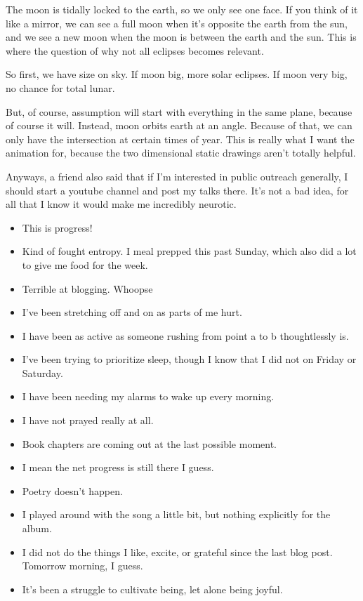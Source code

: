 \documentclass[12pt]{article}[titlepage]
\newcommand{\1}{\={a}}
\newcommand{\2}{\={e}}
\newcommand{\3}{\={\i}}
\newcommand{\4}{\=o}
\newcommand{\5}{\=u}
\newcommand{\6}{\={A}}
\renewcommand{\,}{\textsuperscript{,}}
\begin{document}
The moon is tidally locked to the earth, so we only see one face.
If you think of it like a mirror, we can see a full moon when it's opposite the earth from the sun, and we see a new moon when the moon is between the earth and the sun.
This is where the question of why not all eclipses becomes relevant.

So first, we have size on sky.
If moon big, more solar eclipses.
If moon very big, no chance for total lunar.

But, of course, assumption will start with everything in the same plane, because of course it will.
Instead, moon orbits earth at an angle.
Because of that, we can only have the intersection at certain times of year.
This is really what I want the animation for, because the two dimensional static drawings aren't totally helpful.

Anyways, a friend also said that if I'm interested in public outreach generally, I should start a youtube channel and post my talks there.
It's not a bad idea, for all that I know it would make me incredibly neurotic.

\begin{itemize}
\item This is progress!
\item Kind of fought entropy. I meal prepped this past Sunday, which also did a lot to give me food for the week.
\item Terrible at blogging. Whoopse
\item I've been stretching off and on as parts of me hurt.
\item I have been as active as someone rushing from point a to b thoughtlessly is.
\item I've been trying to prioritize sleep, though I know that I did not on Friday or Saturday.
\item I have been needing my alarms to wake up every morning.
\item I have not prayed really at all.
\item Book chapters are coming out at the last possible moment.
\item I mean the net progress is still there I guess.
\item Poetry doesn't happen.
\item I played around with the song a little bit, but nothing explicitly for the album.
\item I did not do the things I like, excite, or grateful since the last blog post. Tomorrow morning, I guess.
\item It's been a struggle to cultivate being, let alone being joyful.
\end{itemize}
\end{document}
